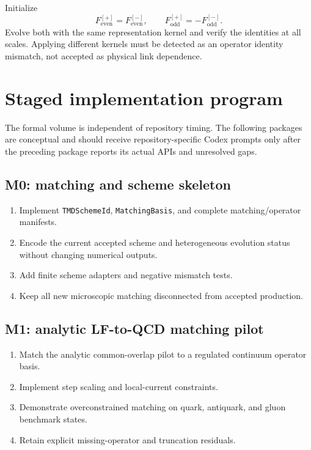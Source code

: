 \documentclass[11pt]{article}
\newcommand{\even}{\mathrm{even}}
\newcommand{\odd}{\mathrm{odd}}
\begin{document}
Initialize
\begin{equation}
 F_{\even}^{[+]}=F_{\even}^{[-]},
 \qquad
 F_{\odd}^{[+]}=-F_{\odd}^{[-]}.
 \label{eq:benchmark-link-pair}
\end{equation}
Evolve both with the same representation kernel and verify the identities at
all scales.  Applying different kernels must be detected as an operator
identity mismatch, not accepted as physical link dependence.

\section{Staged implementation program}
\label{sec:stages}

The formal volume is independent of repository timing.  The following
packages are conceptual and should receive repository-specific Codex prompts
only after the preceding package reports its actual APIs and unresolved gaps.

\subsection{M0: matching and scheme skeleton}

\begin{enumerate}
\item Implement \texttt{TMDSchemeId}, \texttt{MatchingBasis}, and complete
      matching/operator manifests.
\item Encode the current accepted scheme and heterogeneous evolution status
      without changing numerical outputs.
\item Add finite scheme adapters and negative mismatch tests.
\item Keep all new microscopic matching disconnected from accepted production.
\end{enumerate}

\subsection{M1: analytic LF-to-QCD matching pilot}

\begin{enumerate}
\item Match the analytic common-overlap pilot to a regulated continuum operator
      basis.
\item Implement step scaling and local-current constraints.
\item Demonstrate overconstrained matching on quark, antiquark, and gluon
      benchmark states.
\item Retain explicit missing-operator and truncation residuals.
\end{enumerate}
\end{document}

